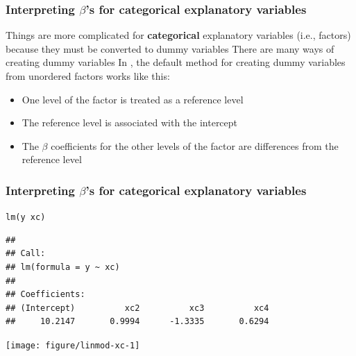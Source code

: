 \documentclass[color=usenames,dvipsnames]{beamer}\usepackage[]{graphicx}\usepackage[]{color}
\makeatletter
\newcommand{\hlopt}[1]{\textcolor[rgb]{0,0,0}{#1}}%
\newcommand{\hlstd}[1]{\textcolor[rgb]{0,0,0}{#1}}%
\newcommand{\hlkwd}[1]{\textcolor[rgb]{0.004,0.004,0.506}{#1}}%
\newenvironment{kframe}{%
 \def\at@end@of@kframe{}%
 \ifinner\ifhmode%
  \def\at@end@of@kframe{\end{minipage}}%
  \begin{minipage}{\columnwidth}%
 \fi\fi%
 \def\FrameCommand##1{\hskip\@totalleftmargin \hskip-\fboxsep
 \colorbox{shadecolor}{##1}\hskip-\fboxsep
     \hskip-\linewidth \hskip-\@totalleftmargin \hskip\columnwidth}%
 \MakeFramed {\advance\hsize-\width
   \@totalleftmargin\z@ \linewidth\hsize
   \@setminipage}}%
 {\par\unskip\endMakeFramed%
 \at@end@of@kframe}
\newenvironment{knitrout}{}{} %
\newcommand{\inr}[1]{\colorbox{inlinecolor}{\texttt{#1}}}
\makeatother
\begin{document}
\begin{frame}[fragile]
  \frametitle{\small Interpreting $\beta$'s for categorical explanatory variables}
  Things are more complicated for {\bf categorical} explanatory
  variables (i.e., factors) because they must be converted to dummy
  variables
  \pause
  \vfill
  There are many ways of creating dummy variables
  \pause
  \vfill
  In \R, the default method for creating dummy variables from
  unordered factors works like
  this: %
  \begin{itemize}
    \item One level of the factor is treated as a \alert{reference level}
    \item The reference level is associated with the intercept
    \item The $\beta$ coefficients for the other levels of the factor
      are differences from the reference level
  \end{itemize}
\end{frame}





\begin{frame}[fragile]
  \frametitle{\small Interpreting $\beta$'s for categorical explanatory variables}
\small 

\centering
\begin{knitrout}\tiny
{}\color{fgcolor}\begin{kframe}
\begin{alltt}
\hlkwd{lm}\hlstd{(y}\hlopt{~}\hlstd{xc)}
\end{alltt}
\begin{verbatim}
## 
## Call:
## lm(formula = y ~ xc)
## 
## Coefficients:
## (Intercept)          xc2          xc3          xc4  
##     10.2147       0.9994      -1.3335       0.6294
\end{verbatim}
\end{kframe}
\end{knitrout}
  \texttt{[image: figure/linmod-xc-1]} \\
\end{frame}
\end{document}
